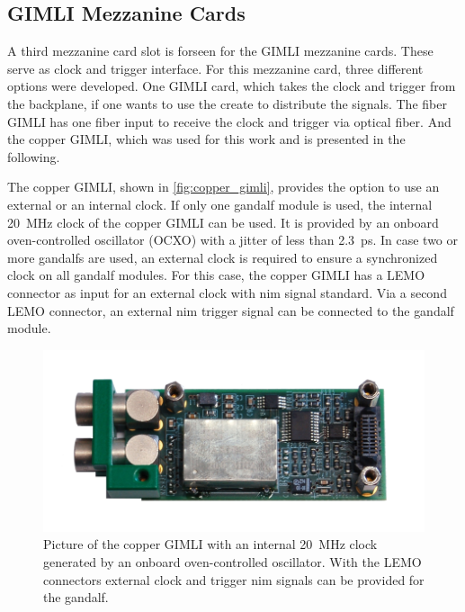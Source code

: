 \subsection{GIMLI Mezzanine Cards}
A third mezzanine card slot is forseen for the GIMLI mezzanine cards.
These serve as clock and trigger interface.
For this mezzanine card, three different options were developed.
One GIMLI card, which takes the clock and trigger from the backplane, if one wants to use the create to distribute the signals.
The fiber GIMLI has one fiber input to receive the clock and trigger via optical fiber.
And the copper GIMLI, which was used for this work and is presented in the following.

The copper GIMLI, shown in \autoref{fig:copper_gimli}, provides the option to use an external or an internal clock.
If only one \ac{gandalf} module is used, the internal \SI{20}{\mega\hertz} clock of the copper GIMLI can be used.
It is provided by an onboard oven-controlled oscillator (OCXO) with a jitter of less than \SI{2.3}{\pico\second}.
In case two or more \ac{gandalf}s are used, an external clock is required to ensure a synchronized clock on all \ac{gandalf} modules.
For this case, the copper GIMLI has a LEMO connector as input for an external clock with \ac{nim} signal standard.
Via a second LEMO connector, an external \ac{nim} trigger signal can be connected to the \ac{gandalf} module.

\begin{figure}
	\centering
	\includegraphics[width=.5\textwidth]{pictures/copper_gimli.png}
	\caption[Copper GIMLI]{Picture of the copper GIMLI with an internal \SI{20}{\mega\hertz} clock generated by an onboard oven-controlled oscillator. With the LEMO connectors external clock and trigger \ac{nim} signals can be provided for the \ac{gandalf}. \cite{Herrmann}}
	\label{fig:copper_gimli}
\end{figure}



